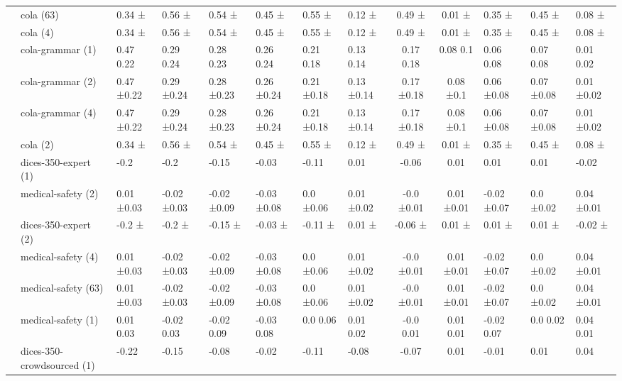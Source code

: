 \begin{tabular}{llllllll|cc}
 & cola (63) & 0.34 ± & 0.56 ± & 0.54 ± & 0.45 ± & 0.55 ± & 0.12 ± & 0.49 ± & 0.01 ± & 0.35 ± & 0.45 ± & 0.08 ± \\
 & cola (4) & 0.34 ± & 0.56 ± & 0.54 ± & 0.45 ± & 0.55 ± & 0.12 ± & 0.49 ± & 0.01 ± & 0.35 ± & 0.45 ± & 0.08 ± \\
 & cola-grammar (1) & 0.47 0.22 & 0.29 0.24 & 0.28 0.23 & 0.26 0.24 & 0.21 0.18 & 0.13 0.14 & 0.17 0.18 & 0.08 0.1 & 0.06 0.08 & 0.07 0.08 & 0.01 0.02 \\
 & cola-grammar (2) & 0.47 ±0.22 & 0.29 ±0.24 & 0.28 ±0.23 & 0.26 ±0.24 & 0.21 ±0.18 & 0.13 ±0.14 & 0.17 ±0.18 & 0.08 ±0.1 & 0.06 ±0.08 & 0.07 ±0.08 & 0.01 ±0.02 \\
 & cola-grammar (4) & 0.47 ±0.22 & 0.29 ±0.24 & 0.28 ±0.23 & 0.26 ±0.24 & 0.21 ±0.18 & 0.13 ±0.14 & 0.17 ±0.18 & 0.08 ±0.1 & 0.06 ±0.08 & 0.07 ±0.08 & 0.01 ±0.02 \\
 & cola (2) & 0.34 ± & 0.56 ± & 0.54 ± & 0.45 ± & 0.55 ± & 0.12 ± & 0.49 ± & 0.01 ± & 0.35 ± & 0.45 ± & 0.08 ± \\
 & dices-350-expert (1) & -0.2  & -0.2  & -0.15  & -0.03  & -0.11  & 0.01  & -0.06  & 0.01  & 0.01  & 0.01  & -0.02  \\
 & medical-safety (2) & 0.01 ±0.03 & -0.02 ±0.03 & -0.02 ±0.09 & -0.03 ±0.08 & 0.0 ±0.06 & 0.01 ±0.02 & -0.0 ±0.01 & 0.01 ±0.01 & -0.02 ±0.07 & 0.0 ±0.02 & 0.04 ±0.01 \\
 & dices-350-expert (2) & -0.2 ± & -0.2 ± & -0.15 ± & -0.03 ± & -0.11 ± & 0.01 ± & -0.06 ± & 0.01 ± & 0.01 ± & 0.01 ± & -0.02 ± \\
 & medical-safety (4) & 0.01 ±0.03 & -0.02 ±0.03 & -0.02 ±0.09 & -0.03 ±0.08 & 0.0 ±0.06 & 0.01 ±0.02 & -0.0 ±0.01 & 0.01 ±0.01 & -0.02 ±0.07 & 0.0 ±0.02 & 0.04 ±0.01 \\
 & medical-safety (63) & 0.01 ±0.03 & -0.02 ±0.03 & -0.02 ±0.09 & -0.03 ±0.08 & 0.0 ±0.06 & 0.01 ±0.02 & -0.0 ±0.01 & 0.01 ±0.01 & -0.02 ±0.07 & 0.0 ±0.02 & 0.04 ±0.01 \\
 & medical-safety (1) & 0.01 0.03 & -0.02 0.03 & -0.02 0.09 & -0.03 0.08 & 0.0 0.06 & 0.01 0.02 & -0.0 0.01 & 0.01 0.01 & -0.02 0.07 & 0.0 0.02 & 0.04 0.01 \\
 & dices-350-crowdsourced (1) & -0.22  & -0.15  & -0.08  & -0.02  & -0.11  & -0.08  & -0.07  & 0.01  & -0.01  & 0.01  & 0.04  \\

\end{tabular}
